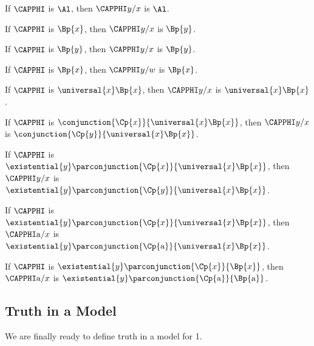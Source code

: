 \begin{majorILnc}{}
	\begin{cenumerate}
		\item If $\CAPPHI$ is $\Al$, then $\CAPPHI\variable{y}/\variable{x}$ is $\Al$.
		\item If $\CAPPHI$ is $\Bp{\variable{x}}$, then $\CAPPHI\variable{y}/\variable{x}$ is $\Bp{\variable{y}}$.
		\item If $\CAPPHI$ is $\Bp{\variable{y}}$, then $\CAPPHI\variable{y}/\variable{x}$ is $\Bp{\variable{y}}$.
		\item If $\CAPPHI$ is $\Bp{\variable{x}}$, then $\CAPPHI\variable{y}/\variable{w}$ is $\Bp{\variable{x}}$.
		\item If $\CAPPHI$ is $\universal{x}\Bp{\variable{x}}$, then $\CAPPHI\variable{y}/\variable{x}$ is $\universal{x}\Bp{\variable{x}}$.
		\item If $\CAPPHI$ is $\conjunction{\Cp{\variable{x}}}{\universal{x}\Bp{\variable{x}}}$, then $\CAPPHI\variable{y}/\variable{x}$ is $\conjunction{\Cp{\variable{y}}}{\universal{x}\Bp{\variable{x}}}$.
		\item If $\CAPPHI$ is $\existential{\variable{y}}\parconjunction{\Cp{\variable{x}}}{\universal{x}\Bp{\variable{x}}}$, then $\CAPPHI\variable{y}/\variable{x}$ is $\existential{\variable{y}}\parconjunction{\Cp{\variable{y}}}{\universal{x}\Bp{\variable{x}}}$.
		\item If $\CAPPHI$ is $\existential{\variable{y}}\parconjunction{\Cp{\variable{x}}}{\universal{x}\Bp{\variable{x}}}$, then $\CAPPHI\constant{a}/\variable{x}$ is $\existential{\variable{y}}\parconjunction{\Cp{\constant{a}}}{\universal{x}\Bp{\variable{x}}}$.
		\item If $\CAPPHI$ is $\existential{\variable{y}}\parconjunction{\Cp{\variable{x}}}{\Bp{\variable{x}}}$, then $\CAPPHI\constant{a}/\variable{x}$ is $\existential{\variable{y}}\parconjunction{\Cp{\constant{a}}}{\Bp{\constant{a}}}$.
	\end{cenumerate}
\end{majorILnc}


\subsection{Truth in a Model}\label{GQL1 Truth in an Interpretation}
We are finally ready to define truth in a model for \GQL{}1.

